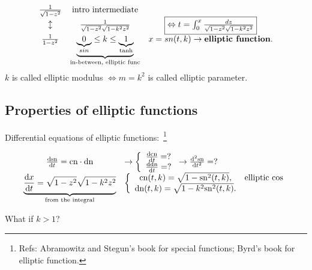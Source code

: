 \[
\begin{array}{ccc}
\frac{1}{\sqrt{1-z^2}} & \text{intro intermediate}  \\
\updownarrow & \frac{1}{\sqrt{1-z^2}\sqrt{1-k^2z^2}} &  \fbox{$\Leftrightarrow                                                                            t=\int^x_0 \frac{dz}{\sqrt{1-z^2}\sqrt{1-k^2z^2}}$}  \\
\frac{1}{1-z^2} &  \underbrace{\underbrace{0}_{sin}\leq k \leq \underbrace{1}_{\tanh}}_{\text{in-between, elliptic func}} & x=sn(t,k)\rightarrow \textbf{elliptic function}.
\end{array}
\]
$k$ is called elliptic modulus $\Leftrightarrow m=k^2$ is called elliptic parameter.

\subsection{Properties of elliptic functions}
Differential equations of elliptic functions:~\footnote{Refs: Abramowitz and Stegun's book for special functions; Byrd's book for elliptic function.}

\begin{align*}
\begin{array}{cl}
\frac{{\mathrm d} {\mathrm{sn}}}{{\mathrm d}t} = \mathrm{cn} \cdot \mathrm{dn} &\rightarrow\left\{ \begin{array}{c}
                                            \frac{{\mathrm d} {\mathrm{cn}}}{{\mathrm d}t} =?\\
                                            \frac{{\mathrm d} {\mathrm{dn}}}{{\mathrm d}t} =?
                                            \end{array}\right.\rightarrow \frac{{\mathrm d}^2 {\mathrm{sn}}}{{\mathrm d}t^2} =? \\
\underbrace{\frac{{\mathrm d} {x}}{{\mathrm d}t} =\sqrt{1-z^2}\sqrt{1-k^2z^2}}_{\text{from the integral}} & \left\{ \begin{array}{cc}
                                            \mathrm{cn}(t,k) =\sqrt{1-\mathrm{sn}^2(t,k)}, & \text{elliptic $\cos$}\\
                                            \mathrm{dn}(t,k) = \sqrt{1-k^2\mathrm{sn}^2(t,k)}.
                                            \end{array}\right.
\end{array}
\end{align*}


What if $k>1$?

